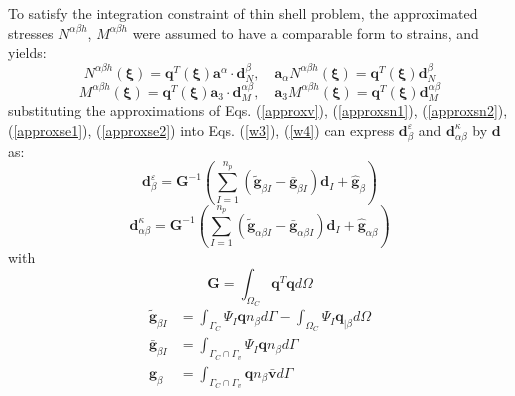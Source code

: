 To satisfy the integration constraint of thin shell problem, the approximated stresses $N^{\alpha\beta h}$, $M^{\alpha\beta h}$ were assumed to have a comparable form to strains, and yields:
\begin{equation}\label{approxse1}
N^{\alpha\beta h}(\boldsymbol \xi) = \boldsymbol q^T(\boldsymbol \xi) \boldsymbol a^\alpha \cdot \boldsymbol d^{\beta}_N,\quad
\boldsymbol a_\alpha N^{\alpha\beta h}(\boldsymbol \xi) = \boldsymbol q^T(\boldsymbol \xi) \boldsymbol d_N^\beta
\end{equation}
\begin{equation}\label{approxse2}
    M^{\alpha\beta h}(\boldsymbol \xi) = \boldsymbol q^T(\boldsymbol \xi) \boldsymbol a_3 \cdot \boldsymbol d^{\alpha\beta}_M,\quad
    \boldsymbol a_3 M^{\alpha\beta h}(\boldsymbol \xi) = \boldsymbol q^T(\boldsymbol \xi) \boldsymbol d^{\alpha\beta}_M
\end{equation}
substituting the approximations of Eqs. (\ref{approxv}), (\ref{approxsn1}), (\ref{approxsn2}), (\ref{approxse1}), (\ref{approxse2}) into Eqs. (\ref{w3}), (\ref{w4}) can express $\boldsymbol d^\varepsilon_\beta$ and $\boldsymbol d^\kappa_{\alpha\beta}$ by $\boldsymbol d$ as:
\begin{equation}\label{depsilon}
\boldsymbol d^\varepsilon_\beta = \boldsymbol G^{-1} \left (\sum_{I=1}^{n_p}(\tilde{\boldsymbol g}_{\beta I} - \bar{\boldsymbol g}_{\beta I}) \boldsymbol d_I + \hat{\boldsymbol g}_\beta \right )
\end{equation}
\begin{equation}\label{dkappa}
\boldsymbol d^\kappa_{\alpha\beta} = \boldsymbol G^{-1} \left (\sum_{I=1}^{n_p}(\tilde{\boldsymbol g}_{\alpha\beta I} - \bar{\boldsymbol g}_{\alpha\beta I})\boldsymbol d_I + \hat{\boldsymbol g}_{\alpha\beta} \right )
\end{equation}
with
\begin{equation}
\boldsymbol G = \int_{\Omega_C} \boldsymbol q^T \boldsymbol q d\Omega
\end{equation}
\begin{subequations}\label{gn}
\begin{align}
\tilde{\boldsymbol g}_{\beta I} &= \int_{\Gamma_C} \Psi_I \boldsymbol q n_\beta d\Gamma
- \int_{\Omega_C} \Psi_I \boldsymbol q_{\vert \beta} d\Omega \\
\bar{\boldsymbol g}_{\beta I} &= \int_{\Gamma_C\cap\Gamma_v} \Psi_I \boldsymbol q n_\beta d\Gamma \\
\hat{\boldsymbol g}_{\beta} &= \int_{\Gamma_C\cap\Gamma_v} \boldsymbol q n_\beta \bar{\boldsymbol v} d\Gamma 
\end{align}
\end{subequations}

